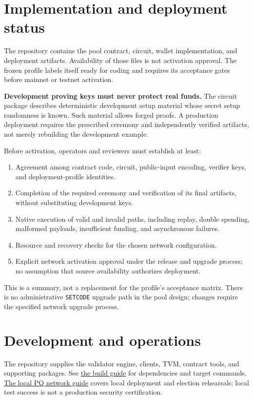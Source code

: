 \documentclass[11pt,a4paper]{article}
\newcommand{\code}[1]{\texttt{#1}}
\newcommand{\repo}[2]{\href{https://github.com/tosnetwork/tos/blob/main/#1}{#2}}
\begin{document}
\section{Implementation and deployment status}
The repository contains the pool contract, circuit, wallet implementation,
and deployment artifacts. Availability of those files is not activation
approval. The frozen profile labels itself ready for coding and requires its
acceptance gates before mainnet or testnet activation.

\textbf{Development proving keys must never protect real funds.} The circuit
package describes deterministic development setup material whose secret
setup randomness is known. Such material allows forged proofs. A production
deployment requires the prescribed ceremony and independently verified
artifacts, not merely rebuilding the development example.

Before activation, operators and reviewers must establish at least:
\begin{enumerate}
\item Agreement among contract code, circuit, public-input encoding, verifier
keys, and deployment-profile identities.
\item Completion of the required ceremony and verification of its final
artifacts, without substituting development keys.
\item Native execution of valid and invalid paths, including replay, double
spending, malformed payloads, insufficient funding, and asynchronous failures.
\item Resource and recovery checks for the chosen network configuration.
\item Explicit network activation approval under the release and upgrade
process; no assumption that source availability authorizes deployment.
\end{enumerate}
This is a summary, not a replacement for the profile's acceptance matrix.
There is no administrative \code{SETCODE} upgrade path in the pool design;
changes require the specified network upgrade process.

\section{Development and operations}
The repository supplies the validator engine, clients, TVM, contract tools,
and supporting packages. See \repo{BUILD.md}{the build guide} for dependencies
and target commands. \repo{doc/Local-PQ-Network.md}{The local PQ network guide}
covers local deployment and election rehearsals; local test success is not a
production security certification.
\end{document}
